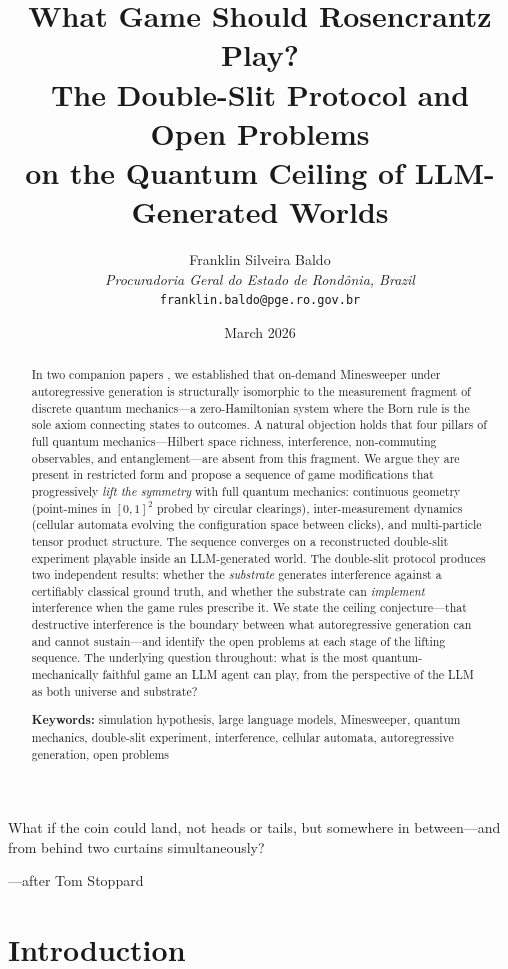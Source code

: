 \documentclass[12pt,a4paper]{article}
\title{%
  \textbf{What Game Should Rosencrantz Play?}\\[6pt]
  \large The Double-Slit Protocol and Open Problems\\
         on the Quantum Ceiling of LLM-Generated Worlds%
}
\author{
  Franklin Silveira Baldo\\
  \textit{Procuradoria Geral do Estado de Rondônia, Brazil}\\
  \texttt{franklin.baldo@pge.ro.gov.br}
}
\date{March 2026}
\theoremstyle{definition}
\theoremstyle{remark}
\begin{document}
\maketitle

\begin{abstract}
\noindent
In two companion papers \citep{Baldo2026Rosencrantz,Baldo2026Residue}, we established that on-demand Minesweeper under autoregressive generation is structurally isomorphic to the measurement fragment of discrete quantum mechanics---a zero-Hamiltonian system where the Born rule is the sole axiom connecting states to outcomes.  A natural objection holds that four pillars of full quantum mechanics---Hilbert space richness, interference, non-commuting observables, and entanglement---are absent from this fragment.  We argue they are present in restricted form and propose a sequence of game modifications that progressively \emph{lift the symmetry} with full quantum mechanics: continuous geometry (point-mines in $[0,1]^2$ probed by circular clearings), inter-measurement dynamics (cellular automata evolving the configuration space between clicks), and multi-particle tensor product structure.  The sequence converges on a reconstructed double-slit experiment playable inside an LLM-generated world.  The double-slit protocol produces two independent results: whether the \emph{substrate} generates interference against a certifiably classical ground truth, and whether the substrate can \emph{implement} interference when the game rules prescribe it.  We state the ceiling conjecture---that destructive interference is the boundary between what autoregressive generation can and cannot sustain---and identify the open problems at each stage of the lifting sequence.  The underlying question throughout: what is the most quantum-mechanically faithful game an LLM agent can play, from the perspective of the LLM as both universe and substrate?

\medskip\noindent
\textbf{Keywords:} simulation hypothesis, large language models, Minesweeper, quantum mechanics, double-slit experiment, interference, cellular automata, autoregressive generation, open problems
\end{abstract}

\vspace{1em}
\epigraph{%
  What if the coin could land, not heads or tails,
  but somewhere in between---and from behind
  two curtains simultaneously?%
}{---after Tom Stoppard}


\section{Introduction}
\label{sec:intro}
\end{document}

